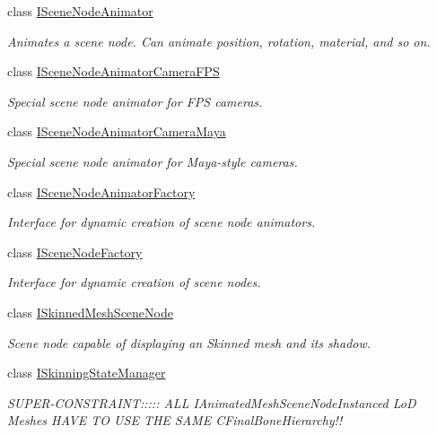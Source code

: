 \begin{DoxyCompactItemize}
class \hyperlink{classirr_1_1scene_1_1ISceneNodeAnimator}{I\+Scene\+Node\+Animator}
\begin{DoxyCompactList}\small\item\em Animates a scene node. Can animate position, rotation, material, and so on. \end{DoxyCompactList}\item 
class \hyperlink{classirr_1_1scene_1_1ISceneNodeAnimatorCameraFPS}{I\+Scene\+Node\+Animator\+Camera\+F\+PS}
\begin{DoxyCompactList}\small\item\em Special scene node animator for F\+PS cameras. \end{DoxyCompactList}\item 
class \hyperlink{classirr_1_1scene_1_1ISceneNodeAnimatorCameraMaya}{I\+Scene\+Node\+Animator\+Camera\+Maya}
\begin{DoxyCompactList}\small\item\em Special scene node animator for Maya-\/style cameras. \end{DoxyCompactList}\item 
class \hyperlink{classirr_1_1scene_1_1ISceneNodeAnimatorFactory}{I\+Scene\+Node\+Animator\+Factory}
\begin{DoxyCompactList}\small\item\em Interface for dynamic creation of scene node animators. \end{DoxyCompactList}\item 
class \hyperlink{classirr_1_1scene_1_1ISceneNodeFactory}{I\+Scene\+Node\+Factory}
\begin{DoxyCompactList}\small\item\em Interface for dynamic creation of scene nodes. \end{DoxyCompactList}\item 
class \hyperlink{classirr_1_1scene_1_1ISkinnedMeshSceneNode}{I\+Skinned\+Mesh\+Scene\+Node}
\begin{DoxyCompactList}\small\item\em Scene node capable of displaying an Skinned mesh and its shadow. \end{DoxyCompactList}\item 
class \hyperlink{classirr_1_1scene_1_1ISkinningStateManager}{I\+Skinning\+State\+Manager}
\begin{DoxyCompactList}\small\item\em S\+U\+P\+E\+R-\/\+C\+O\+N\+S\+T\+R\+A\+I\+NT\+:\+:\+:\+:\+: A\+LL I\+Animated\+Mesh\+Scene\+Node\+Instanced LoD Meshes H\+A\+VE TO U\+SE T\+HE S\+A\+ME C\+Final\+Bone\+Hierarchy!! \end{DoxyCompactList}\item 

\end{DoxyCompactItemize}
